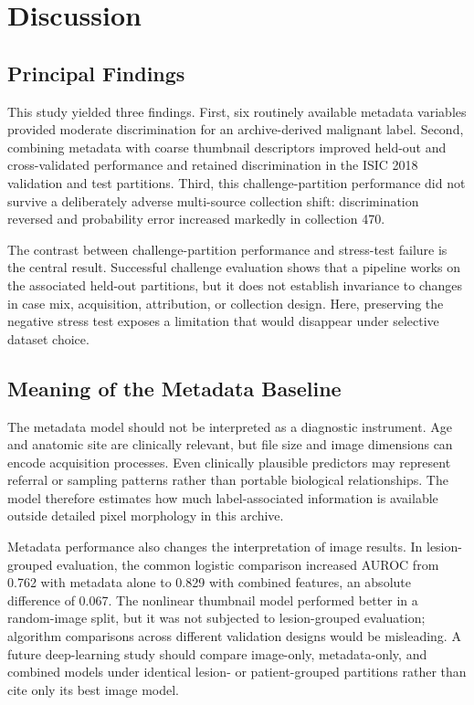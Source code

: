 \documentclass[11pt]{article}
\begin{document}
\section{Discussion}
\subsection{Principal Findings}
This study yielded three findings. First, six routinely available metadata variables provided moderate discrimination for an archive-derived malignant label. Second, combining metadata with coarse thumbnail descriptors improved held-out and cross-validated performance and retained discrimination in the ISIC 2018 validation and test partitions. Third, this challenge-partition performance did not survive a deliberately adverse multi-source collection shift: discrimination reversed and probability error increased markedly in collection 470.

The contrast between challenge-partition performance and stress-test failure is the central result. Successful challenge evaluation shows that a pipeline works on the associated held-out partitions, but it does not establish invariance to changes in case mix, acquisition, attribution, or collection design. Here, preserving the negative stress test exposes a limitation that would disappear under selective dataset choice.

\subsection{Meaning of the Metadata Baseline}
The metadata model should not be interpreted as a diagnostic instrument. Age and anatomic site are clinically relevant, but file size and image dimensions can encode acquisition processes. Even clinically plausible predictors may represent referral or sampling patterns rather than portable biological relationships. The model therefore estimates how much label-associated information is available outside detailed pixel morphology in this archive.

Metadata performance also changes the interpretation of image results. In lesion-grouped evaluation, the common logistic comparison increased AUROC from 0.762 with metadata alone to 0.829 with combined features, an absolute difference of 0.067. The nonlinear thumbnail model performed better in a random-image split, but it was not subjected to lesion-grouped evaluation; algorithm comparisons across different validation designs would be misleading. A future deep-learning study should compare image-only, metadata-only, and combined models under identical lesion- or patient-grouped partitions rather than cite only its best image model.
\end{document}
